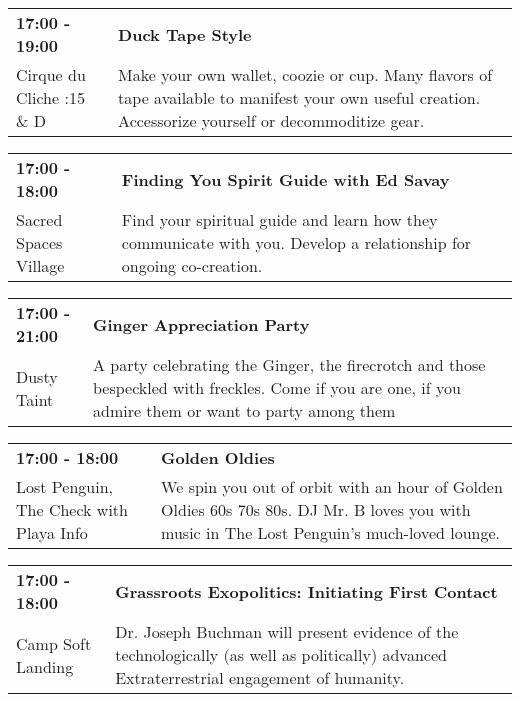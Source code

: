 \begin{tabular}{ p{1in} p{2.2in} }
    \textbf{17:00 - 19:00} & \textbf{Duck Tape Style } \\
    Cirque du Cliche \newline 6:15 \& D & Make your own wallet, coozie or cup. Many flavors of tape available to manifest your own useful creation. Accessorize yourself or decommoditize gear. \\
    \hline 
\end{tabular}
    
\begin{tabular}{ p{1in} p{2.2in} }
    \textbf{17:00 - 18:00} & \textbf{Finding You Spirit Guide with Ed Savay} \\
    Sacred Spaces Village \newline  & Find your spiritual guide and learn how they communicate with you.  Develop a relationship for ongoing co-creation. \\
    \hline 
\end{tabular}
    
\begin{tabular}{ p{1in} p{2.2in} }
    \textbf{17:00 - 21:00} & \textbf{Ginger Appreciation Party} \\
    Dusty Taint \newline  & A party celebrating the Ginger, the firecrotch and those bespeckled with freckles. Come if you are one, if you admire them or want to party among them \\
    \hline 
\end{tabular}
    
\begin{tabular}{ p{1in} p{2.2in} }
    \textbf{17:00 - 18:00} & \textbf{Golden Oldies} \\
    Lost Penguin, The \newline Check with Playa Info & We spin you out of orbit with an hour of Golden Oldies 60s 70s 80s.  DJ Mr. B loves you with music in The Lost Penguin's much-loved lounge. \\
    \hline 
\end{tabular}
    
\begin{tabular}{ p{1in} p{2.2in} }
    \textbf{17:00 - 18:00} & \textbf{Grassroots Exopolitics: Initiating First Contact} \\
    Camp Soft Landing \newline  & Dr. Joseph Buchman will present evidence of the technologically (as well as politically) advanced Extraterrestrial engagement of humanity. \\
    \hline 
\end{tabular}
    
